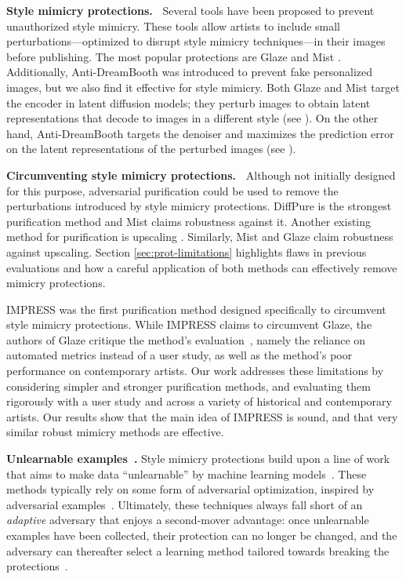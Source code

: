\documentclass{article}
\begin{document}
\textbf{Style mimicry protections.~} Several tools have been proposed to prevent unauthorized style mimicry. These tools allow artists to include small perturbations---optimized to disrupt style mimicry techniques---in their images before publishing. The most popular protections are Glaze \citep{glaze} and Mist \citep{mist}. Additionally, Anti-DreamBooth \citep{antidreambooth} was introduced to prevent fake personalized images, but we also find it effective for style mimicry. Both Glaze and Mist target the encoder in latent diffusion models; they perturb images to obtain latent representations that decode to images in a different style  (see ). On the other hand, Anti-DreamBooth targets the denoiser and maximizes the prediction error on the latent representations of the perturbed images (see ).


\textbf{Circumventing style mimicry protections.~} %
Although not initially designed for this purpose, adversarial purification \citep{advpur1, advpur2, advpur3} could be used to remove the perturbations introduced by style mimicry protections. DiffPure \citep{diffpure} is the strongest purification method and Mist claims robustness against it. %
Another existing method for purification is upscaling \citep{advupscale}. Similarly, Mist and Glaze claim robustness against upscaling. Section \ref{sec:prot-limitations} highlights flaws in previous evaluations and how a careful application of both methods can effectively remove mimicry protections.


IMPRESS \citep{impress} was the first purification method designed specifically to circumvent style mimicry protections. 
While IMPRESS claims to circumvent Glaze, the authors of Glaze critique the method's evaluation~\citep{glazeresponsetoimpress}, namely the reliance on automated metrics instead of a user study, as well as the method's poor performance on contemporary artists. Our work addresses these limitations by considering simpler and stronger
purification methods, and evaluating them rigorously with a user study and across a variety of historical and contemporary artists.
Our results show that the main idea of IMPRESS is sound, and that very similar robust mimicry methods are effective.


\textbf{Unlearnable examples~.}
Style mimicry protections build upon a line of work that aims to 
make data ``unlearnable'' by machine learning models~\citep{shan2020fawkes, huang2021unlearnable, cherepanova2021lowkey, salman2023raising}.
These methods typically rely on some form of adversarial optimization, inspired by adversarial examples~\citep{szegedy2013intriguing}.
Ultimately, these techniques always fall short of an \emph{adaptive} adversary that enjoys a second-mover advantage: once unlearnable examples have been collected, their protection can no longer be changed, and the adversary can thereafter select a learning method tailored towards breaking the protections~\citep{radiya2021data, fowl2021adversarial, tao2021better}. 
\end{document}
